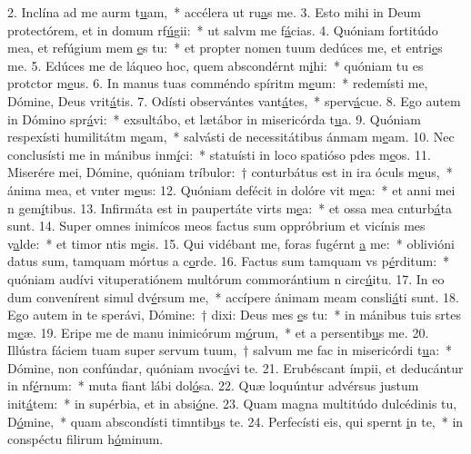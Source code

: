 2. Inclína ad me aurm t\uline{u}am,~* accélera ut ru\uline{a}s me.
3. Esto mihi in Deum protectórem, et in domum rf\uline{ú}gii:~* ut salvm me f\uline{á}cias.
4. Quóniam fortitúdo mea, et refúgium mem \uline{e}s tu:~* et propter nomen tuum dedúces me, et entri\uline{e}s me.
5. Edúces me de láqueo hoc, quem abscondérnt m\uline{i}hi:~* quóniam tu es protctor m\uline{e}us.
6. In manus tuas comméndo spíritm m\uline{e}um:~* redemísti me, Dómine, Deus vrit\uline{á}tis.
7. Odísti observántes vant\uline{á}tes,~* sperv\uline{á}cue.
8. Ego autem in Dómino spr\uline{á}vi:~* exsultábo, et lætábor in misericórda t\uline{u}a.
9. Quóniam respexísti humilitátm m\uline{e}am,~* salvásti de necessitátibus ánmam m\uline{e}am.
10. Nec conclusísti me in mánibus inm\uline{í}ci:~* statuísti in loco spatióso pdes m\uline{e}os.
11. Miserére mei, Dómine, quóniam tríbulor:~† conturbátus est in ira óculs m\uline{e}us,~* ánima mea, et vnter m\uline{e}us:
12. Quóniam defécit in dolóre vit m\uline{e}a:~* et anni mei n gem\uline{í}tibus.
13. Infirmáta est in paupertáte virts m\uline{e}a:~* et ossa mea cnturb\uline{á}ta sunt.
14. Super omnes inimícos meos factus sum oppróbrium et vicínis mes v\uline{a}lde:~* et timor ntis m\uline{e}is.
15. Qui vidébant me, foras fugérnt \uline{a} me:~* oblivióni datus sum, tamquam mórtus a c\uline{o}rde.
16. Factus sum tamquam vs p\uline{é}rditum:~* quóniam audívi vituperatiónem multórum commorántium n circ\uline{ú}itu.
17. In eo dum convenírent simul dv\uline{é}rsum me,~* accípere ánimam meam consli\uline{á}ti sunt.
18. Ego autem in te sperávi, Dómine:~† dixi: Deus mes \uline{e}s tu:~* in mánibus tuis srtes m\uline{e}æ.
19. Eripe me de manu inimicórum m\uline{ó}rum,~* et a persentib\uline{u}s me.
20. Illústra fáciem tuam super servum tuum,~† salvum me fac in misericórdi t\uline{u}a:~* Dómine, non confúndar, quóniam nvoc\uline{á}vi te.
21. Erubéscant ímpii, et deducántur in nf\uline{é}rnum:~* muta fiant lábi dol\uline{ó}sa.
22. Quæ loquúntur advérsus justum init\uline{á}tem:~* in supérbia, et in absi\uline{ó}ne.
23. Quam magna multitúdo dulcédinis tu, D\uline{ó}mine,~* quam abscondísti timntib\uline{u}s te.
24. Perfecísti eis, qui spernt \uline{i}n te,~* in conspéctu filirum h\uline{ó}minum.
